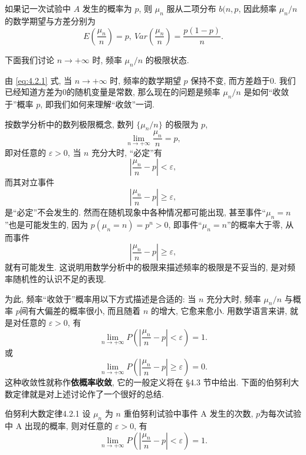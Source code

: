 如果记一次试验中 $ A $ 发生的概率为 $ p $, 则 $ \mu_n $ 服从二项分布 $ b (n, p $, 因此频率 $ \mu_n / n $ 的数学期望与方差分别为
\begin{equation}\label{eq:4.2.1}
    E \left( \frac{\mu_n}{n} \right) = p, \ Var \left( \frac{\mu_n}{n} \right) = \frac{p ( 1 - p )}{n}.
\end{equation}

下面我们讨论 $ n \to +\infty $ 时, 频率 $ \mu_n / n $ 的极限状态.

由 \eqref{eq:4.2.1} 式, 当 $ n \to +\infty $  时, 频率的数学期望 $ p $ 保持不变, 而方差趋于0.
我们已经知道方差为0的随机变量是常数, 那么现在的问题是频率 $ \mu_n / n $ 是如何``收敛于''概率 $ p $, 即我们如何来理解``收敛''一词.

按数学分析中的数列极限概念, 数列 $ \{ \mu_n / n \} $ 的极限为 $ p $,
\begin{equation*}
    \lim_{n \to +\infty} \frac{\mu_n}{n} = p,
\end{equation*}
即对任意的 $ \varepsilon > 0 $, 当 $ n $ 充分大时, ``必定''有
\begin{equation*}
    \left\lvert \frac{\mu_n}{n} - p \right\rvert < \varepsilon,
\end{equation*}
而其对立事件
\begin{equation*}
    \left\lvert \frac{\mu_n}{n} - p \right\rvert \geq \varepsilon,
\end{equation*}
是``必定''不会发生的.
然而在随机现象中各种情况都可能出现, 甚至事件``$ \mu_n = n $''也是可能发生的, 因为 $ p ( \mu_n = n )=p^n > 0 $, 即事件``$ \mu_n = n $''的概率大于零, 从而事件
\begin{equation*}
    \left\lvert \frac{\mu_n}{n} - p \right\rvert \geq \varepsilon,
\end{equation*}
就有可能发生.
这说明用数学分析中的极限来描述频率的极限是不妥当的, 是对频率随机性的认识不足的表现.

为此, 频率``收敛于''概率用以下方式描述是合适的: 当 $ n $ 充分大时, 频率 $ \mu_n / n $ 与概率 $ p $间有大偏差的概率很小, 而且随着 $ n $ 的增大, 它愈来愈小.
用数学语言来讲, 就是对任意的 $ \varepsilon > 0 $, 有
\begin{equation}\label{eq:4.2.2}
    \lim_{n \to +\infty} P \left( \left\lvert \frac{\mu_n}{n} - p \right\rvert < \varepsilon \right) = 1.
\end{equation}
或
\begin{equation}\label{eq:4.2.3}
    \lim_{n \to +\infty} P \left( \left\lvert \frac{\mu_n}{n} - p \right\rvert \geq \varepsilon \right) = 0.
\end{equation}
这种收敛性就称作\textbf{依概率收敛}, 它的一般定义将在 \S 4.3 节中给出.
下面的伯努利大数定律就是对上述讨论作了一个很好的总结.
\begin{theorem}{伯努利大数定律}{4.2.1}
    设 $ \mu_n $ 为 $ n $ 重伯努利试验中事件 A 发生的次数, $ p $为每次试验中 A 出现的概率, 则对任意的 $ \varepsilon > 0 $, 有
    \begin{equation*}
        \lim_{n \to +\infty} P \left( \left\lvert \frac{\mu_n}{n} - p \right\rvert < \varepsilon \right) = 1.
    \end{equation*}
\end{theorem}

